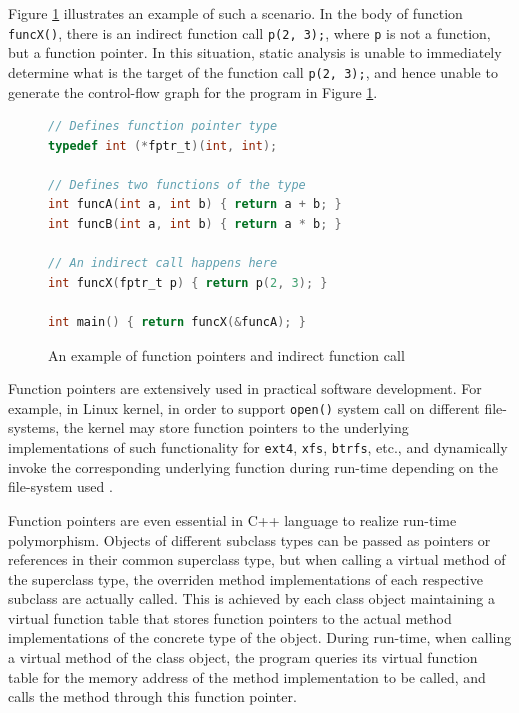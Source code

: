Figure \ref{fig:fptr} illustrates an example of such a scenario. In the body of function \texttt{funcX()}, there is an indirect function call \texttt{p(2, 3);}, where \texttt{p} is not a function, but a function pointer. In this situation, static analysis is unable to immediately determine what is the target of the function call \texttt{p(2, 3);}, and hence unable to generate the control-flow graph for the program in Figure \ref{fig:fptr}.

\begin{figure}[h]
    \centering
    \begin{lstlisting}[language=c]
// Defines function pointer type
typedef int (*fptr_t)(int, int);

// Defines two functions of the type
int funcA(int a, int b) { return a + b; }
int funcB(int a, int b) { return a * b; }

// An indirect call happens here
int funcX(fptr_t p) { return p(2, 3); }

int main() { return funcX(&funcA); }
    \end{lstlisting}
    \caption{An example of function pointers and indirect function call}
    \label{fig:fptr}
\end{figure}

\newpage

Function pointers are extensively used in practical software development. For example, in Linux kernel, in order to support \texttt{open()} system call on different file-systems, the kernel may store function pointers to the underlying implementations of such functionality for \texttt{ext4}, \texttt{xfs}, \texttt{btrfs}, etc., and dynamically invoke the corresponding underlying function during run-time depending on the file-system used \cite{mlta}.

Function pointers are even essential in C++ language to realize run-time polymorphism. Objects of different subclass types can be passed as pointers or references in their common superclass type, but when calling a virtual method of the superclass type, the overriden method implementations of each respective subclass are actually called. This is achieved by each class object maintaining a virtual function table that stores function pointers to the actual method implementations of the concrete type of the object. During run-time, when calling a virtual method of the class object, the program queries its virtual function table for the memory address of the method implementation to be called, and calls the method through this function pointer.


